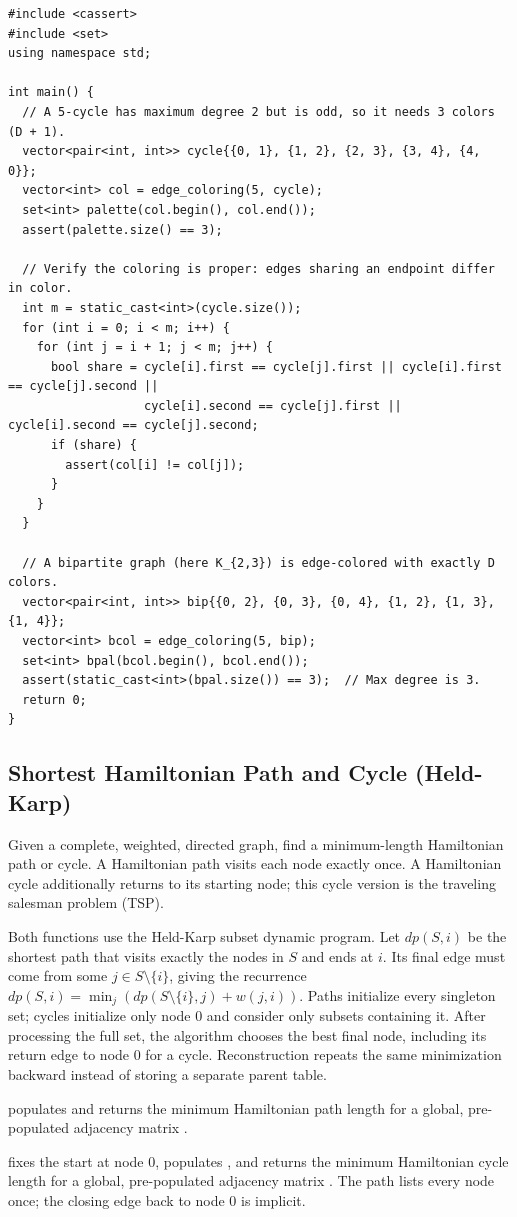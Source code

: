 \begin{lstlisting}[style=cpp]
#include <cassert>
#include <set>
using namespace std;

int main() {
  // A 5-cycle has maximum degree 2 but is odd, so it needs 3 colors (D + 1).
  vector<pair<int, int>> cycle{{0, 1}, {1, 2}, {2, 3}, {3, 4}, {4, 0}};
  vector<int> col = edge_coloring(5, cycle);
  set<int> palette(col.begin(), col.end());
  assert(palette.size() == 3);

  // Verify the coloring is proper: edges sharing an endpoint differ in color.
  int m = static_cast<int>(cycle.size());
  for (int i = 0; i < m; i++) {
    for (int j = i + 1; j < m; j++) {
      bool share = cycle[i].first == cycle[j].first || cycle[i].first == cycle[j].second ||
                   cycle[i].second == cycle[j].first || cycle[i].second == cycle[j].second;
      if (share) {
        assert(col[i] != col[j]);
      }
    }
  }

  // A bipartite graph (here K_{2,3}) is edge-colored with exactly D colors.
  vector<pair<int, int>> bip{{0, 2}, {0, 3}, {0, 4}, {1, 2}, {1, 3}, {1, 4}};
  vector<int> bcol = edge_coloring(5, bip);
  set<int> bpal(bcol.begin(), bcol.end());
  assert(static_cast<int>(bpal.size()) == 3);  // Max degree is 3.
  return 0;
}
\end{lstlisting}
\subsection{Shortest Hamiltonian Path and Cycle (Held-Karp)}
\label{sec:4.7.4}
Given a complete, weighted, directed graph, find a minimum-length Hamiltonian path or cycle. A Hamiltonian path visits each node exactly once. A Hamiltonian cycle additionally returns to its starting node; this cycle version is the traveling salesman problem (TSP).

Both functions use the Held-Karp subset dynamic program. Let $dp(S, i)$ be the shortest path that visits exactly the nodes in $S$ and ends at $i$. Its final edge must come from some $j \in S \setminus \{i\}$, giving the recurrence $dp(S, i) = \min_j(dp(S \setminus \{i\}, j) + w(j, i))$. Paths initialize every singleton set; cycles initialize only node $0$ and consider only subsets containing it. After processing the full set, the algorithm chooses the best final node, including its return edge to node $0$ for a cycle. Reconstruction repeats the same minimization backward instead of storing a separate parent table.

\begin{compactitem}
  \item {} populates  and returns the minimum Hamiltonian path length for a global, pre-populated adjacency matrix .
  \item {} fixes the start at node $0$, populates , and returns the minimum Hamiltonian cycle length for a global, pre-populated adjacency matrix . The path lists every node once; the closing edge back to node $0$ is implicit.
\end{compactitem}

